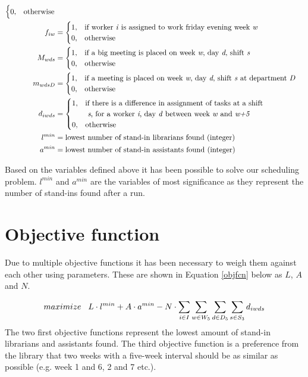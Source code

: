 \begin{align}
\begin{cases}
 		0, & \text{otherwise}
	\end{cases}
	\\
	f_{iw}&=
	\begin{cases}
 		1, & \text{if worker \textit{i} is assigned to work friday evening week \textit{w}} \\
 		0, & \text{otherwise}
	\end{cases}	
	\\
	M_{wds}&=
	\begin{cases}
	 	1, & \text{if a big meeting is placed on week \textit{w}, day \textit{d}, shift \textit{s}} \\
	 	0, & \text{otherwise}
	\end{cases}
	\\
	m_{wdsD}&=
	\begin{cases}
	 	1, & \text{if a meeting is placed on week \textit{w}, day \textit{d}, shift \textit{s} at department \textit{D}} \\
	 	0, & \text{otherwise}
	\end{cases}
	\\
	d_{iwds}&=
	\begin{cases}
	 	1, & \text{if there is a difference in assignment of tasks at a shift}\\
	 		& \text{ \textit{s}, for a worker \textit{i}, day \textit{d} between week \textit{w} and \textit{w+5}} \\
	 	0, & \text{otherwise}
	\end{cases}
	\\
	l^{min}&= \text{lowest number of stand-in librarians found (integer)} \\
	a^{min}&= \text{lowest number of stand-in assistants found (integer)}
\end{align}

Based on the variables defined above it has been possible to solve our scheduling problem. \textit{$l^{min}$} and \textit{$a^{min}$} are the variables of most significance as they represent the number of stand-ins found after a run. 

\section{Objective function} \label{section:obj}
Due to multiple objective functions it has been necessary to weigh them against each other using parameters. These are shown in Equation \ref{objfcn} below as $L$, $A$ and $N$.

\begin{equation} \label{objfcn}
maximize \hspace{0.3cm} L \cdot l^{min} + A \cdot a^{min} - N \cdot \sum_{i \in I}\sum_{w \in W_5}\sum_{d \in D_5}\sum_{s \in S_3} d_{iwds}
\end{equation}
The two first objective functions represent the lowest amount of stand-in librarians and assistants found. The third objective function is a preference from the library that two weeks with a five-week interval should be as similar as possible (e.g. week 1 and 6, 2 and 7 etc.).

